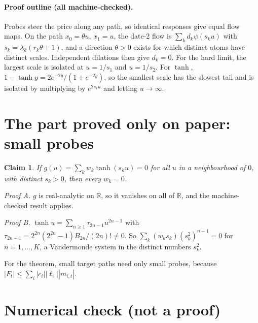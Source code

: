 \documentclass[11pt]{article}
\newtheorem*{claim}{Claim}
\begin{document}
\paragraph{Proof outline (all machine-checked).} Probes steer the price along any path, so identical responses give equal flow maps. On the path $x_0=\theta u$, $x_1=u$, the date-2 flow is $\sum_kd_k\psi(s_ku)$ with $s_k=\lambda_k(r_k\theta+1)$, and a direction $\theta>0$ exists for which distinct atoms have distinct scales. Independent dilations then give $d_k=0$. For the hard limit, the largest scale is isolated at $u=1/s_1$ and $u=1/s_2$. For $\tanh$, $1-\tanh y=2e^{-2y}/(1+e^{-2y})$, so the smallest scale has the slowest tail and is isolated by multiplying by $e^{2s_1u}$ and letting $u\to\infty$.

\section{The part proved only on paper: small probes}

\begin{claim}
If $g(u)=\sum_kw_k\tanh(s_ku)=0$ for all $u$ in a neighbourhood of $0$, with distinct $s_k>0$, then every $w_k=0$.
\end{claim}
\noindent\emph{Proof A.} $g$ is real-analytic on $\mathbb R$, so it vanishes on all of $\mathbb R$, and the machine-checked result applies.

\noindent\emph{Proof B.} $\tanh u=\sum_{n\ge1}\tau_{2n-1}u^{2n-1}$ with $\tau_{2n-1}=2^{2n}(2^{2n}-1)B_{2n}/(2n)!\ne0$. So $\sum_k(w_ks_k)(s_k^2)^{n-1}=0$ for $n=1,\ldots,K$, a Vandermonde system in the distinct numbers $s_k^2$.

\noindent For the theorem, small target paths need only small probes, because $|F_t|\le\sum_i|c_i||\ell_i||m_{i,t}|$.

\section{Numerical check (not a proof)}
\end{document}
